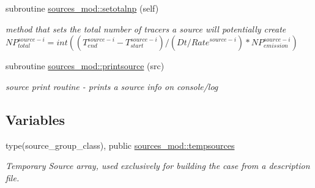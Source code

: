 \begin{DoxyCompactItemize}
subroutine \mbox{\hyperlink{namespacesources__mod_a9a62c41b71d2d6ad85def74087542ef5}{sources\+\_\+mod\+::setotalnp}} (self)
\begin{DoxyCompactList}\small\item\em method that sets the total number of tracers a source will potentially create ${NP}_{total}^{source-i}=int((T_{end}^{source-i}-T_{start}^{source-i})/(Dt/{Rate}^{source-i})*{NP}_{emission}^{source-i})$ \end{DoxyCompactList}\item 
subroutine \mbox{\hyperlink{namespacesources__mod_a641fe9ecc295e486a714c1aaa133d991}{sources\+\_\+mod\+::printsource}} (src)
\begin{DoxyCompactList}\small\item\em source print routine -\/ prints a source info on console/log \end{DoxyCompactList}\end{DoxyCompactItemize}
\subsection*{Variables}
\begin{DoxyCompactItemize}
\item 
type(source\+\_\+group\+\_\+class), public \mbox{\hyperlink{namespacesources__mod_ab04ea8c02cdf83a1a356c8710ae811d5}{sources\+\_\+mod\+::tempsources}}
\begin{DoxyCompactList}\small\item\em Temporary Source array, used exclusively for building the case from a description file. \end{DoxyCompactList}\end{DoxyCompactItemize}
